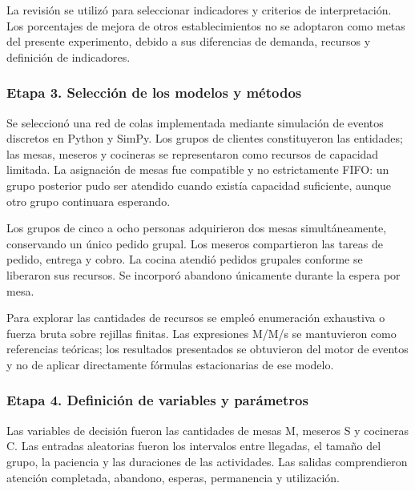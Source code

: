 \documentclass[10pt,a4paper,twocolumn]{article}
\begin{document}
La revisión se utilizó para seleccionar indicadores y criterios de interpretación. Los porcentajes de mejora de otros establecimientos no se adoptaron como metas del presente experimento, debido a sus diferencias de demanda, recursos y definición de indicadores.

\subsubsection*{Etapa 3. Selección de los modelos y métodos}

Se seleccionó una red de colas implementada mediante simulación de eventos discretos en Python y SimPy. Los grupos de clientes constituyeron las entidades; las mesas, meseros y cocineras se representaron como recursos de capacidad limitada. La asignación de mesas fue compatible y no estrictamente FIFO: un grupo posterior pudo ser atendido cuando existía capacidad suficiente, aunque otro grupo continuara esperando.

Los grupos de cinco a ocho personas adquirieron dos mesas simultáneamente, conservando un único pedido grupal. Los meseros compartieron las tareas de pedido, entrega y cobro. La cocina atendió pedidos grupales conforme se liberaron sus recursos. Se incorporó abandono únicamente durante la espera por mesa.

Para explorar las cantidades de recursos se empleó enumeración exhaustiva o fuerza bruta sobre rejillas finitas. Las expresiones M/M/s se mantuvieron como referencias teóricas; los resultados presentados se obtuvieron del motor de eventos y no de aplicar directamente fórmulas estacionarias de ese modelo.

\subsubsection*{Etapa 4. Definición de variables y parámetros}

Las variables de decisión fueron las cantidades de mesas M, meseros S y cocineras C. Las entradas aleatorias fueron los intervalos entre llegadas, el tamaño del grupo, la paciencia y las duraciones de las actividades. Las salidas comprendieron atención completada, abandono, esperas, permanencia y utilización.
\end{document}
